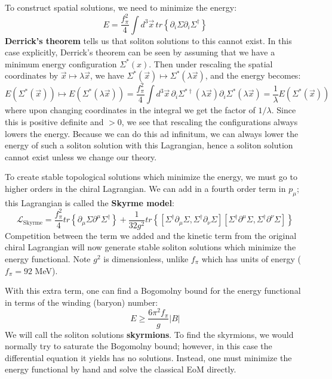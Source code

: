 \documentclass[11pt, oneside]{article}   	%
\theoremstyle{definition}
\begin{document}
To construct spatial solutions, we need to minimize the energy:
\begin{equation}
	E = \frac{f_\pi^2}{4} \int d^3\vec x\, tr\left\{\partial_i\Sigma \partial_i\Sigma^\dagger\right\}
\end{equation}
\textbf{Derrick's theorem} tells us that soliton solutions to this cannot exist. In this case explicitly, Derrick's theorem can be seen by 
assuming that we have a minimum energy configuration $\Sigma^*(x)$. Then under rescaling the spatial coordinates by 
$\vec x\mapsto \lambda \vec x$, we have $\Sigma^*(\vec x)\mapsto \Sigma^*(\lambda\vec x)$, and the energy becomes:
\begin{equation}
	E(\Sigma^*(\vec x))\mapsto E(\Sigma^*(\lambda\vec x)) = \frac{f_\pi^2}{4}\int d^3\vec x\, \partial_i \Sigma^{*\dagger}(\lambda \vec x) 
	\partial_i \Sigma^*(\lambda\vec x) = \frac{1}{\lambda} E(\Sigma^*(\vec x))
\end{equation}
where upon changing coordinates in the integral we get the factor of $1 / \lambda$. Since this is positive definite and $> 0$, we see that 
rescaling the configurations always lowers the energy. Because we can do this ad infinitum, we can always lower the energy of such a 
soliton solution with this Lagrangian, hence a soliton solution cannot exist unless we change our theory. 

To create stable topological solutions which minimize the energy, we must go to higher orders in the chiral Lagrangian. We can add in a 
fourth order term in $p_\mu$; this Lagrangian is called the \textbf{Skyrme model}:
\begin{equation}
	\mathcal L_\mathrm{Skyrme} = \frac{f_\pi^2}{4}tr\left\{\partial_\mu\Sigma\partial^\mu \Sigma^\dagger\right\} + \frac{1}{32g^2} 
	tr\left\{[\Sigma^\dagger\partial_\mu \Sigma, \Sigma^\dagger\partial_\nu \Sigma] [\Sigma^\dagger\partial^\mu \Sigma, 
	\Sigma^\dagger\partial^\nu \Sigma]\right\}
\end{equation}
Competition between the term we added and the kinetic term from the original chiral Lagrangian will now generate stable soliton 
solutions which minimize the energy functional. Note $g^2$ is dimensionless, unlike $f_\pi$ which has units of energy ($f_\pi = 92$ MeV). 

With this extra term, one can find a Bogomolny bound for the energy functional in terms of the winding (baryon) number:
\begin{equation}
	E\geq \frac{6\pi^2 f_\pi}{g} |B|
\end{equation}
We will call the soliton solutions \textbf{skyrmions}. To find the skyrmions, we would normally try to saturate the Bogomolny bound; however, 
in this case the differential equation it yields has no solutions. Instead, one must minimize the energy functional by hand and solve the 
classical EoM directly. 
\end{document}
